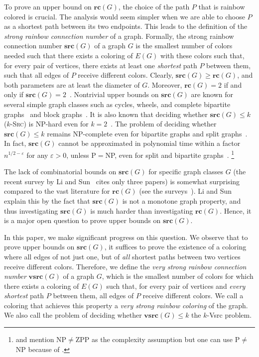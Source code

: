 \documentclass[letter,runningheads,envcountsame,envcountsect]{llncs}
\newcommand{\vsrc}{\mathbf{vsrc}}
\newcommand{\src}{\mathbf{src}}
\newcommand{\rc}{\mathbf{rc}}
\newcommand{\kvsrc}{{\sc $k$-Vsrc}}
\begin{document}
To prove an upper bound on $\rc(G)$, the choice of the path $P$ that is rainbow colored is crucial. The analysis would seem simpler when we are able to choose $P$ as a shortest path between its two endpoints. This leads to the definition of the \emph{strong rainbow connection number} of a graph. Formally, the strong rainbow connection number $\src(G)$ of a graph $G$ is the smallest number of colors needed such that there exists a coloring of $E(G)$ with these colors such that, for every pair of vertices, there exists at least one \emph{shortest} path $P$ between them, such that all edges of $P$ receive different colors. Clearly, $\src(G) \geq \rc(G)$, and both parameters are at least the diameter of $G$. Moreover, $\rc(G) = 2$ if and only if $\src(G) = 2$~\cite{chakraborty2011hardness}. Nontrivial upper bounds on $\src(G)$ are known for several simple graph classes such as cycles, wheels, and complete bipartite graphs~\cite{chartrandrainbow} and block graphs~\cite{lauri2016chasing}. It is also known that deciding whether $\src(G) \leq k$ (\textsc{$k$-Src}) is NP-hard even for $k=2$~\cite{chakraborty2011hardness}. The problem of deciding whether $\src(G) \leq k$ remains NP-complete even for bipartite graphs and split graphs~\cite{ananth2011rainbow,keranen2014}. In fact, $\src(G)$ cannot be approximated in polynomial time within a factor $n^{1/2-\varepsilon}$ for any $\varepsilon > 0$, unless P$=$NP, even for split and bipartite graphs~\cite{ananth2011rainbow,keranen2014}.%
\footnote{\cite{ananth2011rainbow} and \cite{keranen2014} mention NP$\neq$ZPP as the complexity assumption but one can use P$\neq$NP because of \cite{zuckerman2006linear}.}

The lack of combinatorial bounds on $\src(G)$ for specific graph classes $G$ (the recent survey by Li and Sun~\cite{li2017} cites only three papers) is somewhat surprising compared to the vast literature for $\rc(G)$ (see the surveys~\cite{srcli,li2012rainbow,li2017}). Li and Sun~\cite{li2017} explain this by the fact that $\src(G)$ is not a monotone graph property, and thus investigating $\src(G)$ is much harder than investigating $\rc(G)$. Hence, it is a major open question to prove upper bounds on $\src(G)$.

In this paper, we make significant progress on this question. We observe that to prove upper bounds on $\src(G)$, it suffices to prove the existence of a coloring where all edges of not just one, but of \emph{all} shortest paths between two vertices receive different colors. Therefore, we define the \emph{very strong rainbow connection number} $\vsrc(G)$ of a graph $G$, which is the smallest number of colors for which there exists a coloring of $E(G)$ such that, for every pair of vertices and \emph{every} \emph{shortest} path $P$ between them, all edges of $P$ receive different colors. We call a coloring that achieves this property a \emph{very strong rainbow coloring} of the graph. We also call the problem of deciding whether $\vsrc(G) \leq k$ the {\kvsrc} problem. 
\end{document}

